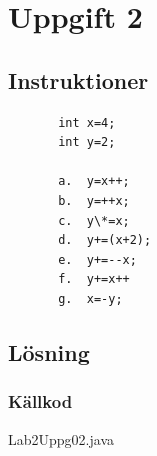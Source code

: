 \section{Uppgift 2}\label{sec:uppg02}

\subsection{Instruktioner}

\begin{verbatim}
       int x=4;
       int y=2;

       a.  y=x++;
       b.  y=++x;
       c.  y\*=x;
       d.  y+=(x+2);
       e.  y+=--x;
       f.  y+=x++
       g.  x=-y;
\end{verbatim}


\subsection{Lösning}

%


\subsubsection{Källkod}
\caption{Lab2Uppg02.java}
\label{src:uppg02}


